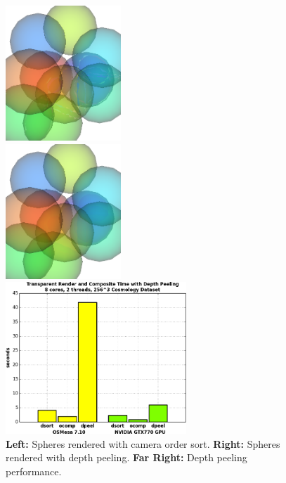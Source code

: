 \documentclass[a4paper,10pt]{report}
\begin{document}
\begin{figure}
\centering
\begin{minipage}{0.28\textwidth}
\begin{center}
\includegraphics[height=2.0in]{./spheres_with_sort_crop.png}
\end{center}
\end{minipage}
\begin{minipage}{0.28\textwidth}
\begin{center}
\includegraphics[height=2.0in]{./spheres_with_depth_peel_crop.png}
\end{center}
\end{minipage}
\begin{minipage}{0.3\textwidth}
\begin{center}
\includegraphics[height=2.25in]{./depth_peeling_time_cosmo.png}
\end{center}
\end{minipage}
\caption{\footnotesize {\bf Left:} Spheres rendered with camera order sort. {\bf Right:} Spheres rendered with depth peeling. {\bf Far Right:} Depth peeling performance.}
\label{fig:depth_peel}
\end{figure}
\end{document}
